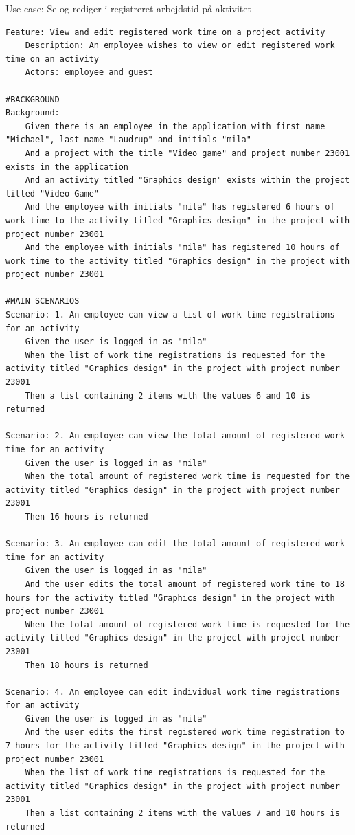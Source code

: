 \begin{listing}[H]
    \centering
    \caption{Use case: Se og rediger i registreret arbejdstid på aktivitet}\label{lst:usecase_se_og_rediger_i_registreret_arbejdstid_paa_aktivitet}
    \begin{verbatim}  
Feature: View and edit registered work time on a project activity
    Description: An employee wishes to view or edit registered work time on an activity
    Actors: employee and guest

#BACKGROUND
Background:
    Given there is an employee in the application with first name "Michael", last name "Laudrup" and initials "mila"
    And a project with the title "Video game" and project number 23001 exists in the application
    And an activity titled "Graphics design" exists within the project titled "Video Game"
    And the employee with initials "mila" has registered 6 hours of work time to the activity titled "Graphics design" in the project with project number 23001
    And the employee with initials "mila" has registered 10 hours of work time to the activity titled "Graphics design" in the project with project number 23001

#MAIN SCENARIOS
Scenario: 1. An employee can view a list of work time registrations for an activity
    Given the user is logged in as "mila"
    When the list of work time registrations is requested for the activity titled "Graphics design" in the project with project number 23001
    Then a list containing 2 items with the values 6 and 10 is returned

Scenario: 2. An employee can view the total amount of registered work time for an activity
    Given the user is logged in as "mila"
    When the total amount of registered work time is requested for the activity titled "Graphics design" in the project with project number 23001
    Then 16 hours is returned

Scenario: 3. An employee can edit the total amount of registered work time for an activity
    Given the user is logged in as "mila"
    And the user edits the total amount of registered work time to 18 hours for the activity titled "Graphics design" in the project with project number 23001
    When the total amount of registered work time is requested for the activity titled "Graphics design" in the project with project number 23001
    Then 18 hours is returned

Scenario: 4. An employee can edit individual work time registrations for an activity
    Given the user is logged in as "mila"
    And the user edits the first registered work time registration to 7 hours for the activity titled "Graphics design" in the project with project number 23001
    When the list of work time registrations is requested for the activity titled "Graphics design" in the project with project number 23001
    Then a list containing 2 items with the values 7 and 10 hours is returned


\end{verbatim}
\end{listing}
